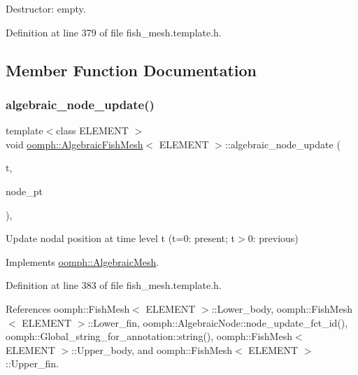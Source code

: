 Destructor\+: empty. 



Definition at line 379 of file fish\+\_\+mesh.\+template.\+h.



\subsection{Member Function Documentation}
\mbox{\label{classoomph_1_1AlgebraicFishMesh_ac66d6542472dac702a7414aa9d7f995f}} 
\subsubsection{\texorpdfstring{algebraic\+\_\+node\+\_\+update()}{algebraic\_node\_update()}}
{\footnotesize\ttfamily template$<$class E\+L\+E\+M\+E\+NT $>$ \\
void \hyperlink{classoomph_1_1AlgebraicFishMesh}{oomph\+::\+Algebraic\+Fish\+Mesh}$<$ E\+L\+E\+M\+E\+NT $>$\+::algebraic\+\_\+node\+\_\+update (\begin{DoxyParamCaption}\item[{const unsigned \&}]{t,  }\item[{\hyperlink{classoomph_1_1AlgebraicNode}{Algebraic\+Node} $\ast$\&}]{node\+\_\+pt }\end{DoxyParamCaption})\hspace{0.3cm}{\ttfamily [inline]}, {\ttfamily [virtual]}}



Update nodal position at time level t (t=0\+: present; t$>$0\+: previous) 



Implements \hyperlink{classoomph_1_1AlgebraicMesh_ab01d6f93354f3c4e5c9d1f0a5885a65b}{oomph\+::\+Algebraic\+Mesh}.



Definition at line 383 of file fish\+\_\+mesh.\+template.\+h.



References oomph\+::\+Fish\+Mesh$<$ E\+L\+E\+M\+E\+N\+T $>$\+::\+Lower\+\_\+body, oomph\+::\+Fish\+Mesh$<$ E\+L\+E\+M\+E\+N\+T $>$\+::\+Lower\+\_\+fin, oomph\+::\+Algebraic\+Node\+::node\+\_\+update\+\_\+fct\+\_\+id(), oomph\+::\+Global\+\_\+string\+\_\+for\+\_\+annotation\+::string(), oomph\+::\+Fish\+Mesh$<$ E\+L\+E\+M\+E\+N\+T $>$\+::\+Upper\+\_\+body, and oomph\+::\+Fish\+Mesh$<$ E\+L\+E\+M\+E\+N\+T $>$\+::\+Upper\+\_\+fin.

